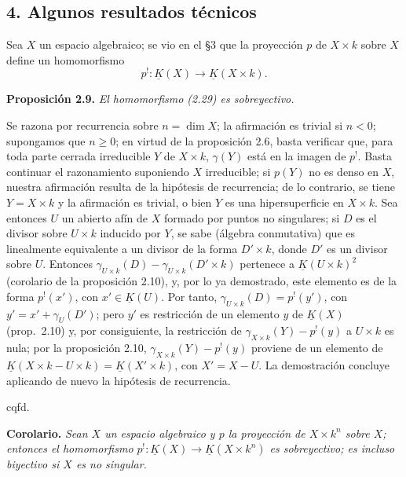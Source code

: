 \providecommand{\sisi}[2]{#2}

\subsection*{4. Algunos resultados técnicos}

Sea $X$ un espacio algebraico; se vio en el \S 3 que la proyección $p$ de $X\times k$ sobre $X$ define un homomorfismo
\begin{equation}\tag{2.29}
 p^!:\underline K(X)\longrightarrow\underline K(X\times k).
\end{equation}

\textbf{Proposición 2.9.} \emph{El homomorfismo (2.29) es sobreyectivo.}

Se razona por recurrencia sobre $n=\dim X$; la afirmación es trivial si $n<0$; supongamos que $n\geq0$; en virtud de la proposición 2.6, basta verificar que, para toda parte cerrada irreducible $Y$ de $X\times k$, $\gamma(Y)$ está en la imagen de $p^!$. Basta continuar el razonamiento suponiendo $X$ irreducible; si $p(Y)$ no es denso en $X$, nuestra afirmación resulta de la hipótesis de recurrencia; de lo contrario, se tiene $Y=X\times k$ y la afirmación es trivial, o bien $Y$ es una hipersuperficie en $X\times k$. Sea entonces $U$ un abierto afín de $X$ formado por puntos no singulares; si $D$ es el divisor sobre $U\times k$ inducido por $Y$, se sabe (álgebra conmutativa) que es linealmente equivalente a un divisor de la forma $D'\times k$, donde $D'$ es un divisor sobre $U$. Entonces $\gamma_{U\times k}(D)-\gamma_{U\times k}(D'\times k)$ pertenece a $\underline K(U\times k)^2$ (corolario de la proposición 2.10), y, por lo ya demostrado, este elemento es de la forma $p^!(x')$, con $x'\in\underline K(U)$. Por tanto, $\gamma_{U\times k}(D)=p^!(y')$, con $y'=x'+\gamma_U(D')$; pero $y'$ es restricción de un elemento $y$ de $\underline K(X)$ (prop.\ 2.10) y, por consiguiente, la restricción de $\gamma_{X\times k}(\sisi{D}{Y})-p^!(y)$ a $U\times k$ es nula; por la proposición 2.10, $\gamma_{X\times k}(\sisi{D}{Y})-p^!(y)$ proviene de un elemento de $\underline K(X\times k-U\times k)=\underline K(X'\times k)$, con $X'=X-U$. La demostración concluye aplicando de nuevo la hipótesis de recurrencia.
\begin{flushright}cqfd.\end{flushright}

\textbf{Corolario.} \emph{Sean $X$ un espacio algebraico y $p$ la proyección de $X\times k^n$ sobre $X$; entonces el homomorfismo $p^!:\underline K(X)\longrightarrow\underline K(X\times k^n)$ es sobreyectivo; es incluso biyectivo si $X$ es no singular.}


